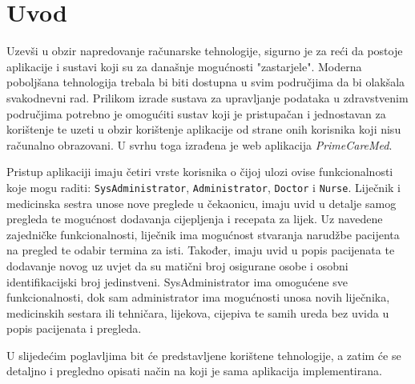 \section{Uvod}

Uzevši u obzir napredovanje računarske tehnologije, sigurno je za reći da postoje aplikacije i sustavi koji su za današnje mogućnosti "zastarjele". Moderna poboljšana tehnologija trebala bi biti dostupna u svim područjima da bi olakšala svakodnevni rad. Prilikom izrade sustava za upravljanje podataka u zdravstvenim područjima potrebno je omogućiti sustav koji je pristupačan i jednostavan za korištenje te uzeti u obzir korištenje aplikacije od strane onih korisnika koji nisu računalno obrazovani. U svrhu toga izrađena je web aplikacija \textit{PrimeCareMed}. 

Pristup aplikaciji imaju četiri vrste korisnika o čijoj ulozi ovise funkcionalnosti koje mogu raditi: \texttt{SysAdministrator}, \texttt{Administrator}, \texttt{Doctor} i \texttt{Nurse}. Liječnik i medicinska sestra unose nove preglede u čekaonicu, imaju uvid u detalje samog pregleda te mogućnost dodavanja cijepljenja i recepata za lijek. Uz navedene zajedničke funkcionalnosti, liječnik ima mogućnost stvaranja narudžbe pacijenta na pregled te odabir termina za isti. Također, imaju uvid u popis pacijenata te dodavanje novog uz uvjet da su matični broj osigurane osobe i osobni identifikacijski broj jedinstveni. SysAdministrator ima omogućene sve funkcionalnosti, dok sam administrator ima mogućnosti unosa novih liječnika, medicinskih sestara ili tehničara, lijekova, cijepiva te samih ureda bez uvida u popis pacijenata i pregleda.

U slijedećim poglavljima bit će predstavljene korištene tehnologije, a zatim će se detaljno i pregledno opisati način na koji je sama aplikacija implementirana.
